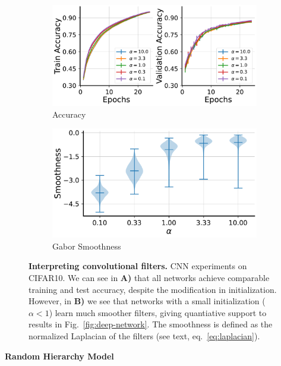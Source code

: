 \documentclass{article}
\theoremstyle{plain}
\theoremstyle{definition}
\theoremstyle{remark}
\begin{document}
\begin{figure}[H]
    \begin{subfigure}{0.535\textwidth}
        \centering
        \includegraphics[width=\linewidth]{fig/deep-networks/gabors/gabors_accuracy.pdf}
        \caption{Accuracy}
    \end{subfigure}
    \begin{subfigure}{0.455\textwidth}
        \centering
        \includegraphics[width=\linewidth]{fig/deep-networks/gabors/gabor_smoothness.pdf}
        \caption{Gabor Smoothness}
    \end{subfigure}
    \caption{\textbf{Interpreting convolutional filters.}
    CNN experiments on CIFAR10. We can see in \textbf{A)} that all networks achieve comparable training and test accuracy, despite the modification in initialization. However, in \textbf{B)} we see that networks with a small initialization ($\alpha<1$) learn much smoother filters, giving quantiative support to results in Fig.~\ref{fig:deep-network}. The smoothness is defined as the normalized Laplacian of the filters (see text, eq.~\ref{eq:laplacian}).
    }
    \label{fig:gabors}
\end{figure}

\textbf{Random Hierarchy Model}
\end{document}
